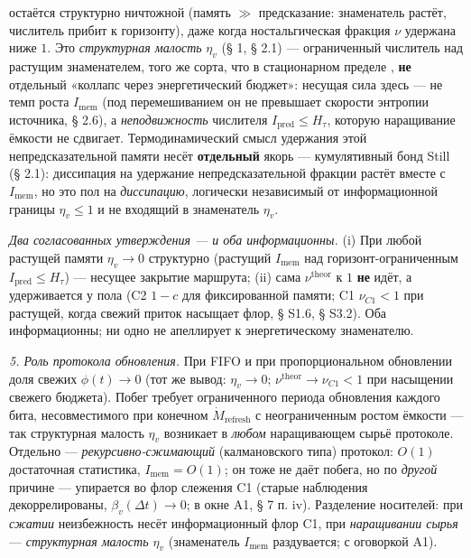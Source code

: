 \documentclass[12pt]{iopart}
\begin{document}
остаётся структурно ничтожной (память \(\gg\) предсказание: знаменатель растёт, числитель прибит к горизонту), даже когда ностальгическая фракция \(\nu\) удержана ниже \(1\). Это \emph{структурная малость} \(\eta_v\) (§ 1, § 2.1) --- ограниченный числитель над растущим знаменателем, того же сорта, что в стационарном пределе \cite{Andriishin2026b}, \textbf{не} отдельный «коллапс через энергетический бюджет»: несущая сила здесь --- не темп роста \(I_{\text{mem}}\) (под перемешиванием он не превышает скорости энтропии источника, § 2.6), а \emph{неподвижность} числителя \(I_{\text{pred}} \le H_\tau\), которую наращивание ёмкости не сдвигает. Термодинамический смысл удержания этой непредсказательной памяти несёт \textbf{отдельный} якорь --- кумулятивный бонд Still (§ 2.1): диссипация на удержание непредсказательной фракции растёт вместе с \(I_{\text{mem}}\), но это пол на \emph{диссипацию}, логически независимый от информационной границы \(\eta_v \le 1\) и не входящий в знаменатель \(\eta_v\).



\emph{Два согласованных утверждения --- и оба информационны.} (i) При любой растущей памяти \(\eta_v \to 0\) структурно (растущий \(I_{\text{mem}}\) над горизонт-ограниченным \(I_{\text{pred}} \le H_\tau\)) --- несущее закрытие маршрута; (ii) сама \(\nu^{\text{theor}}\) к \(1\) \textbf{не} идёт, а удерживается у пола (C2 \(1-c\) для фиксированной памяти; C1 \(\nu_{C1} < 1\) при растущей, когда свежий приток насыщает флор, § S1.6, § S3.2). Оба информационны; ни одно не апеллирует к энергетическому знаменателю.



\emph{5. Роль протокола обновления.} При FIFO и при пропорциональном обновлении доля свежих \(\phi(t) \to 0\) (тот же вывод: \(\eta_v \to 0\); \(\nu^{\text{theor}} \to \nu_{C1} < 1\) при насыщении свежего бюджета). Побег требует ограниченного периода обновления каждого бита, несовместимого при конечном \(\dot M_{\text{refresh}}\) с неограниченным ростом ёмкости --- так структурная малость \(\eta_v\) возникает в \emph{любом} наращивающем сырьё протоколе. Отдельно --- \emph{рекурсивно-сжимающий} (калмановского типа) протокол: \(O(1)\) достаточная статистика, \(I_{\text{mem}} = O(1)\); он тоже не даёт побега, но по \emph{другой} причине --- упирается во флор слежения C1 (старые наблюдения декоррелированы, \(\beta_v(\Delta t)\to0\); в окне A1, § 7 п. iv). Разделение носителей: при \emph{сжатии} неизбежность несёт информационный флор C1, при \emph{наращивании сырья} --- \emph{структурная малость \(\eta_v\)} (знаменатель \(I_{\text{mem}}\) раздувается; с оговоркой A1).
\end{document}
